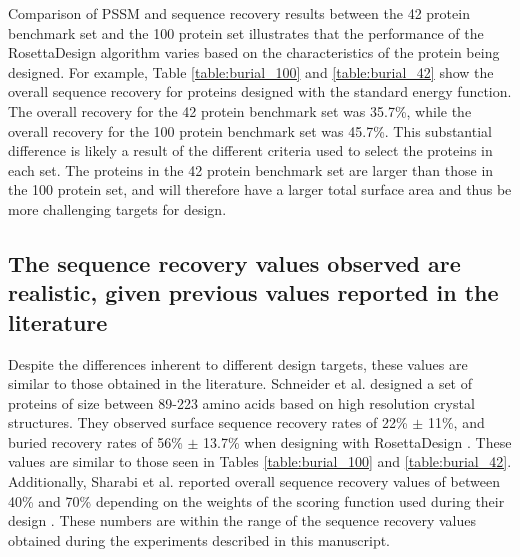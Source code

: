 Comparison of \ac{PSSM} and sequence recovery results between the 42 protein benchmark set and the 100 protein set illustrates that the performance of the RosettaDesign algorithm varies based on the characteristics of the protein being designed.
For example, Table \ref{table:burial_100} and \ref{table:burial_42} show the overall sequence recovery for proteins designed with the standard energy function.
The overall recovery for the 42 protein benchmark set was 35.7\%, while the overall recovery for the 100 protein benchmark set was 45.7\%.
This substantial difference is likely a result of the different criteria used to select the proteins in each set.
The proteins in the 42 protein benchmark set are larger than those in the 100 protein set, and will therefore have a larger total surface area and thus be more challenging targets for design.

\subsection{The sequence recovery values observed are realistic, given previous values reported in the literature}
Despite the differences inherent to different design targets, these values are similar to those obtained in the literature.
Schneider et al. designed a set of proteins of size between 89-223 amino acids based on high resolution crystal structures.
They observed surface sequence recovery rates of 22\% $\pm$ 11\%, and buried recovery rates of 56\% $\pm$ 13.7\% when designing with RosettaDesign \citep{Schneider:2009ig}.
These values are similar to those seen in Tables \ref{table:burial_100} and \ref{table:burial_42}.
Additionally, Sharabi et al. reported overall sequence recovery values of between 40\% and 70\% depending on the weights of the scoring function used during their design \citep{Sharabi:2011ev}.
These numbers are within the range of the sequence recovery values obtained during the experiments described in this manuscript.

